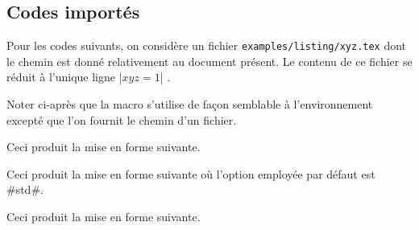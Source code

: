 \documentclass[12pt, a4paper]{article}
\begin{document}

\subsection{Codes importés}

Pour les codes suivants, on considère un fichier \verb+examples/listing/xyz.tex+ dont le chemin est donné relativement au document présent.
Le contenu de ce fichier se réduit à l'unique ligne \bdocinlatex|$x y z = 1$| .

\medskip

Noter ci-après que la macro  s'utilise de façon semblable à l'environnement  excepté que l'on fournit le chemin d'un fichier.




\begin{bdocexa}
	\leavevmode

	\begin{bdoclatex}[code]
	\end{bdoclatex}

	Ceci produit la mise en forme suivante.

\end{bdocexa}




\begin{bdocexa}[À la suite]
	\leavevmode

	\begin{bdoclatex}[code]
	\end{bdoclatex}

	Ceci produit la mise en forme suivante où l'option employée par défaut est \bdocinlatex#std#.

\end{bdocexa}




\begin{bdocexa}
	\leavevmode

	\begin{bdoclatex}[code]
	\end{bdoclatex}

	Ceci produit la mise en forme suivante.

\end{bdocexa}
\end{document}
